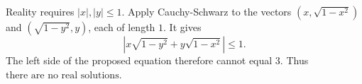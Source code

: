 Reality requires $|x|,|y|\le1$. Apply Cauchy-Schwarz to the vectors $(x,\sqrt{1-x^2})$ and $(\sqrt{1-y^2},y)$, each of length $1$. It gives
\[
\left|x\sqrt{1-y^2}+y\sqrt{1-x^2}\right|\le1.
\]
The left side of the proposed equation therefore cannot equal $3$. Thus $\boxed{\text{there are no real solutions}}$.
